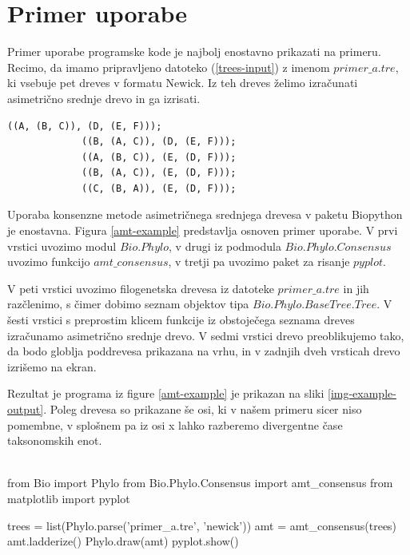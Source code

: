 \documentclass[a4paper, 12pt]{book}
\begin{document}
\section{Primer uporabe}
Primer uporabe programske kode je najbolj enostavno prikazati na primeru. Recimo, da imamo pripravljeno datoteko (\ref{trees-input}) z imenom $primer\_a.tre$, ki vsebuje pet dreves v formatu Newick. Iz teh dreves želimo izračunati asimetrično srednje drevo in ga izrisati.

\begin{lstlisting}[label={trees-input}, caption={Primer petih polno razrešenih filogenetskih dreves s šestimi taksonomskimi enotami.}]
             ((A, (B, C)), (D, (E, F)));
             ((B, (A, C)), (D, (E, F)));
             ((A, (B, C)), (E, (D, F)));
             ((B, (A, C)), (E, (D, F)));
             ((C, (B, A)), (E, (D, F)));
\end{lstlisting}

Uporaba konsenzne metode asimetričnega srednjega drevesa v paketu Biopython je enostavna. Figura \ref{amt-example} predstavlja osnoven primer uporabe. V prvi vrstici uvozimo modul $Bio.Phylo$, v drugi iz podmodula $Bio.Phylo.Consensus$ uvozimo funkcijo $amt\_consensus$,  v tretji pa uvozimo paket za risanje $pyplot$.


V peti vrstici uvozimo filogenetska drevesa iz datoteke $primer\_a.tre$ in jih razčlenimo, s čimer dobimo seznam objektov tipa $Bio.Phylo.BaseTree.Tree$. V šesti vrstici s preprostim klicem funkcije iz obstoječega seznama dreves izračunamo asimetrično srednje drevo. V sedmi vrstici drevo preoblikujemo tako, da bodo globlja poddrevesa prikazana na vrhu, in v zadnjih dveh vrsticah drevo izrišemo na ekran. 

Rezultat je programa iz figure \ref{amt-example} je prikazan na sliki \ref{img-example-output}. Poleg drevesa so prikazane še osi, ki v našem primeru sicer niso pomembne, v splošnem pa iz osi x lahko razberemo divergentne čase taksonomskih enot. \\\\

\begin{python}[label={amt-example}, caption=Primer programske kode za branje dreves iz datotek in izračun asimetričnega srednjega drevesa.]
	from Bio import Phylo
	from Bio.Phylo.Consensus import amt_consensus
	from matplotlib import pyplot
	
	trees = list(Phylo.parse('primer_a.tre', 'newick'))
	amt = amt_consensus(trees)
	amt.ladderize()
	Phylo.draw(amt)
	pyplot.show()
\end{python}
\end{document}
